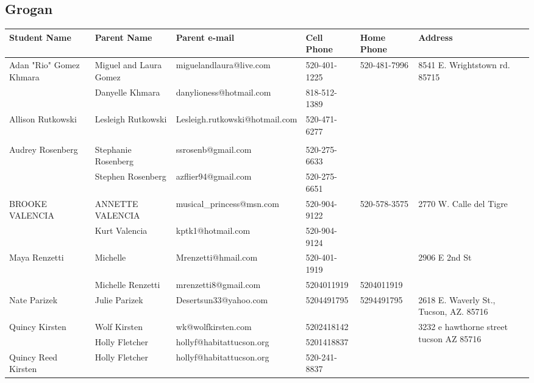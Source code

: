 \documentclass[landscape]{article}\usepackage[]{graphicx}\usepackage[]{color}
\begin{document}
\subsection{Grogan}
\begin{longtable}{|p{100pt}|p{100pt}|p{140pt}|p{60pt}|p{64pt}|p{120pt}|}
\textbf{Student Name} & \textbf{Parent Name} & \textbf{Parent e-mail} & \textbf{Cell Phone} & \textbf{Home Phone} & \textbf{Address}\\
\hline
\hline
\multirow{2}{100pt}{Adan "Rio" Gomez Khmara} & Miguel and Laura Gomez & miguelandlaura@live.com & 520-401-1225 & 520-481-7996 & \multirow{2}{120pt}{8541 E. Wrightstown rd. 85715} \\
 & Danyelle Khmara & danylioness@hotmail.com & 818-512-1389 &  & \\
\hline
\multirow{2}{100pt}{Allison Rutkowski } & Lesleigh Rutkowski  & Lesleigh.rutkowski@hotmail.com & 520-471-6277 &  & \multirow{2}{120pt}{} \\
 &  &  &  &  & \\
\hline
\multirow{2}{100pt}{Audrey Rosenberg} & Stephanie Rosenberg & ssrosenb@gmail.com & 520-275-6633 &  & \multirow{2}{120pt}{} \\
 & Stephen Rosenberg & azflier94@gmail.com & 520-275-6651 &  & \\
\hline
\multirow{2}{100pt}{BROOKE VALENCIA } & ANNETTE VALENCIA & musical\_princess@msn.com & 520-904-9122 & 520-578-3575 & \multirow{2}{120pt}{2770 W. Calle del Tigre} \\
 & Kurt Valencia & kptk1@hotmail.com & 520-904-9124 &  & \\
\hline
\multirow{2}{100pt}{Maya Renzetti } & Michelle  & Mrenzetti@hmail.com & 520-401-1919 &  & \multirow{2}{120pt}{2906 E 2nd St} \\
 & Michelle Renzetti & mrenzetti8@gmail.com & 5204011919 & 5204011919 & \\
\hline
\multirow{2}{100pt}{Nate Parizek} & Julie Parizek & Desertsun33@yahoo.com & 5204491795 & 5294491795 & \multirow{2}{120pt}{2618 E. Waverly St., Tucson, AZ. 85716} \\
 &  &  &  &  & \\
\hline
\multirow{2}{100pt}{Quincy Kirsten} & Wolf Kirsten & wk@wolfkirsten.com & 5202418142 &  & \multirow{2}{120pt}{3232 e hawthorne street tucson AZ 85716} \\
 & Holly Fletcher  & hollyf@habitattucson.org & 5201418837 &  & \\
\hline
\multirow{2}{100pt}{Quincy Reed Kirsten} & Holly Fletcher & hollyf@habitattucson.org & 520-241-8837 &  & \multirow{2}{120pt}{} \\

\end{longtable}
\end{document}

